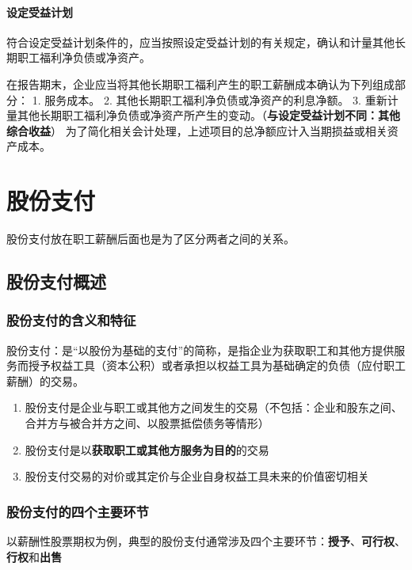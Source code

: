 \documentclass[UTF8,12pt]{ctexart}
\numberwithin{equation}{section} %
\numberwithin{figure}{section}
\numberwithin{table}{section}
\begin{document}
	\paragraph{设定受益计划}
	符合设定受益计划条件的，应当按照设定受益计划的有关规定，确认和计量其他长期职工福利净负债或净资产。
	
	在报告期末，企业应当将其他长期职工福利产生的职工薪酬成本确认为下列组成部分：
	1.	服务成本。
	2.	其他长期职工福利净负债或净资产的利息净额。
	3.	重新计量其他长期职工福利净负债或净资产所产生的变动。（\textbf{与设定受益计划不同：其他综合收益}）
	为了简化相关会计处理，上述项目的总净额应计入当期损益或相关资产成本。
	
	
	
	\newpage
	\section{股份支付}
	股份支付放在职工薪酬后面也是为了区分两者之间的关系。
	\subsection{股份支付概述}
	
	\subsubsection{股份支付的含义和特征}
	股份支付：是“以股份为基础的支付”的简称，是指企业为获取职工和其他方提供服务而授予权益工具（资本公积）或者承担以权益工具为基础确定的负债（应付职工薪酬）的交易。
	
	\begin{enumerate}
		\item 股份支付是企业与职工或其他方之间发生的交易（不包括：企业和股东之间、合并方与被合并方之间、以股票抵偿债务等情形）
		
		\item 股份支付是以\textbf{获取职工或其他方服务为目的}的交易
		
		\item 股份支付交易的对价或其定价与企业自身权益工具未来的价值密切相关
	\end{enumerate}
	
	\subsubsection{股份支付的四个主要环节}
	以薪酬性股票期权为例，典型的股份支付通常涉及四个主要环节：\textbf{授予}、\textbf{可行权}、\textbf{行权}和\textbf{出售}
	
\end{document}
